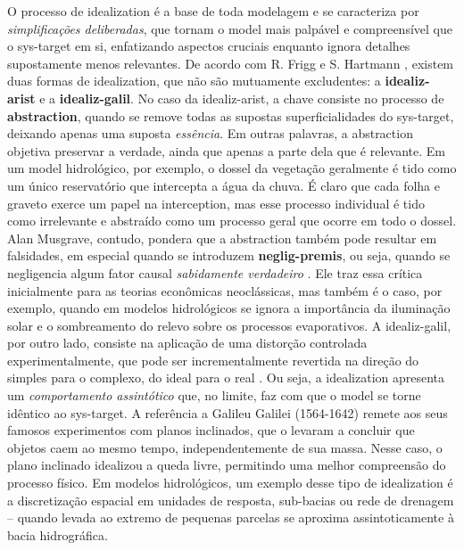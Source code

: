 \documentclass[./main.tex]{subfiles}
\begin{document}
\par O processo de \gls{idealization} é a base de toda modelagem e se caracteriza por \textit{simplificações deliberadas}, que tornam o \gls{model} mais palpável e compreensível que o \gls{sys-target} em si, enfatizando aspectos cruciais enquanto ignora detalhes supostamente menos relevantes. De acordo com R. Frigg e S. Hartmann \cite{sep-models-science}, existem duas formas de \gls{idealization}, que não são mutuamente excludentes: a \textbf{\gls{idealiz-arist}} e a \textbf{\gls{idealiz-galil}}. No caso da \gls{idealiz-arist}, a chave consiste no processo de \textbf{\gls{abstraction}}, quando se remove todas as supostas superficialidades do \gls{sys-target}, deixando apenas uma suposta \textit{essência}. Em outras palavras, a \gls{abstraction} objetiva preservar a verdade, ainda que apenas a parte dela que é relevante. Em um \gls{model} hidrológico, por exemplo, o dossel da vegetação geralmente é tido como um único reservatório que intercepta a água da chuva. É claro que cada folha e graveto exerce um papel na \gls{interception}, mas esse processo individual é tido como irrelevante e abstraído como um processo geral que ocorre em todo o dossel. Alan Musgrave, contudo, pondera que a \gls{abstraction} também pode resultar em falsidades, em especial quando se introduzem \textbf{\gls{neglig-premis}}, ou seja, quando se negligencia algum fator causal \textit{sabidamente verdadeiro} \cite{musgrave1981}. Ele traz essa crítica inicialmente para as teorias econômicas neoclássicas, mas também é o caso, por exemplo, quando em modelos hidrológicos se ignora a importância da iluminação solar e o sombreamento do relevo sobre os processos evaporativos. A \gls{idealiz-galil}, por outro lado, consiste na aplicação de uma distorção controlada experimentalmente, que pode ser incrementalmente revertida na direção do simples para o complexo, do ideal para o real \cite{MCMULLIN1985}. Ou seja, a \gls{idealization} apresenta um \textit{comportamento assintótico} que, no limite, faz com que o \gls{model} se torne idêntico ao \gls{sys-target}. A referência a Galileu Galilei (1564-1642) remete aos seus famosos experimentos com planos inclinados, que o levaram a concluir que objetos caem ao mesmo tempo, independentemente de sua massa. Nesse caso, o plano inclinado idealizou a queda livre, permitindo uma melhor compreensão do processo físico. Em modelos hidrológicos, um exemplo desse tipo de \gls{idealization} é a discretização espacial em unidades de resposta, sub-bacias ou rede de drenagem – quando levada ao extremo de pequenas parcelas se aproxima assintoticamente à bacia hidrográfica.
\end{document}

